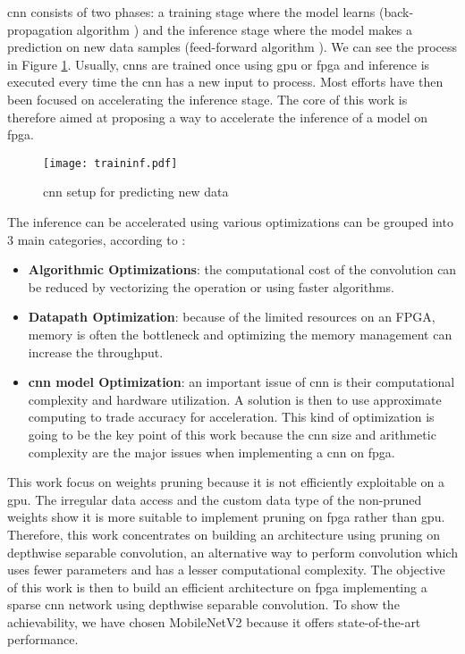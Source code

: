 \acrshort{cnn} consists of two phases: a training stage where the model learns (back-propagation algorithm \cite{lecun_backpropagation_1989}) and the inference stage where the model makes a prediction on new data samples (feed-forward algorithm \cite{zhang_optimizing_2015}). We can see the process in Figure \ref{fig:traininf}. Usually, \acrshort{cnn}s are trained once using \acrshort{gpu} or \acrshort{fpga} and inference is executed every time the \acrshort{cnn} has a new input to process. Most efforts have then been focused on accelerating the inference stage. The core of this work is therefore aimed at proposing a way to accelerate the inference of a model on \acrshort{fpga}.
%
\begin{figure}
    \texttt{[image: traininf.pdf]}
    \caption{\acrshort{cnn} setup for predicting new data}
    \label{fig:traininf}
\end{figure}

The inference can be accelerated using various optimizations can be grouped into 3 main categories, according to \textcite{abdelouahab_accelerating_2018}:
\begin{itemize}
    \item \textbf{Algorithmic Optimizations}: the computational cost of the convolution can be reduced by vectorizing the operation or using faster algorithms.
    \item \textbf{Datapath Optimization}: because of the limited resources on an FPGA, memory is often the bottleneck and optimizing the memory management can increase the throughput.
    \item \textbf{\acrshort{cnn} model Optimization}: an important issue of \acrshort{cnn} is their computational complexity and hardware utilization. A solution is then to use approximate computing to trade accuracy for acceleration. This kind of optimization is going to be the key point of this work because the \acrshort{cnn} size and arithmetic complexity are the major issues when implementing a \acrshort{cnn} on \acrshort{fpga}.
\end{itemize}

This work focus on weights pruning because it is not efficiently exploitable on a \acrshort{gpu}. The irregular data access and the custom data type of the non-pruned weights show it is more suitable to implement pruning on \acrshort{fpga} rather than \acrshort{gpu}. Therefore, this work concentrates on building an architecture using pruning on depthwise separable convolution, an alternative way to perform convolution which uses fewer parameters and has a lesser computational complexity. The objective of this work is then to build an efficient architecture on \acrshort{fpga} implementing a sparse \acrshort{cnn} network using depthwise separable convolution. To show the achievability, we have chosen MobileNetV2 because it offers state-of-the-art performance.

